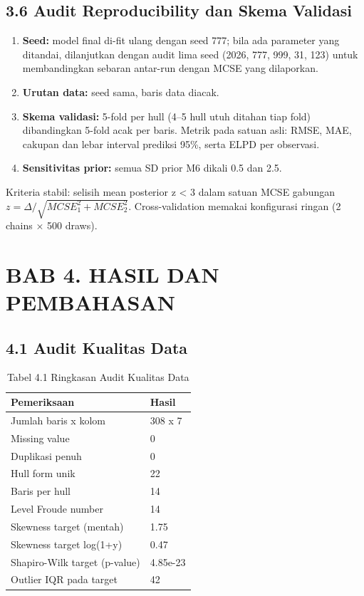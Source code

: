 \documentclass[
]{article}
\providecommand{\tightlist}{%
  \setlength{\itemsep}{0pt}\setlength{\parskip}{0pt}}
\begin{document}
\subsection{3.6 Audit Reproducibility dan Skema
Validasi}\label{audit-reproducibility-dan-skema-validasi}

\begin{enumerate}
\def\labelenumi{\arabic{enumi}.}
\tightlist
\item
  \textbf{Seed:} model final di-fit ulang dengan seed 777; bila ada
  parameter yang ditandai, dilanjutkan dengan audit lima seed (2026,
  777, 999, 31, 123) untuk membandingkan sebaran antar-run dengan MCSE
  yang dilaporkan.
\item
  \textbf{Urutan data:} seed sama, baris data diacak.
\item
  \textbf{Skema validasi:} 5-fold per hull (4--5 hull utuh ditahan tiap
  fold) dibandingkan 5-fold acak per baris. Metrik pada satuan asli:
  RMSE, MAE, cakupan dan lebar interval prediksi 95\%, serta ELPD per
  observasi.
\item
  \textbf{Sensitivitas prior:} semua SD prior M6 dikali 0.5 dan 2.5.
\end{enumerate}

Kriteria stabil: selisih mean posterior \textbar z\textbar{} \textless{}
3 dalam satuan MCSE gabungan \(z=\Delta/\sqrt{MCSE_1^2+MCSE_2^2}\).
Cross-validation memakai konfigurasi ringan (2 chains × 500 draws).

\clearpage

\section{BAB 4. HASIL DAN PEMBAHASAN}\label{bab-4.-hasil-dan-pembahasan}

\subsection{4.1 Audit Kualitas Data}\label{audit-kualitas-data}

\begingroup\fontsize{8.5}{10.5}\selectfont

\begin{longtable}[t]{ll}
\caption{\label{tab:tabel_audit}Tabel 4.1 Ringkasan Audit Kualitas Data}\\
\toprule
Pemeriksaan & Hasil\\
\midrule
Jumlah baris x kolom & 308 x 7\\
Missing value & 0\\
Duplikasi penuh & 0\\
Hull form unik & 22\\
Baris per hull & 14\\
\addlinespace
Level Froude number & 14\\
Skewness target (mentah) & 1.75\\
Skewness target log(1+y) & 0.47\\
Shapiro-Wilk target (p-value) & 4.85e-23\\
Outlier IQR pada target & 42\\
\bottomrule
\end{longtable}
\endgroup{}
\end{document}
